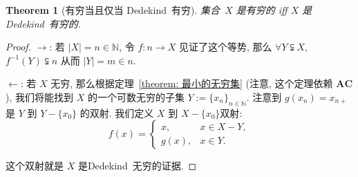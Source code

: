 \documentclass[openany]{ctexbook}
\theoremstyle{plain}
\newtheorem{theorem}{Theorem}[section] %
\theoremstyle{definition}
\newcommand*{\properclass}[1]{\mathbf{#1}}
\begin{document}
\begin{theorem}[有穷当且仅当 Dedekind~有穷]
	集合~$X$ 是有穷的 iff $X$ 是 Dedekind~有穷的.
\end{theorem}
\begin{proof}
	$\to$: 若 $|X| = n \in \mathbb N$, 令 $f \colon n \to X$ 见证了这个等势, 那么 $\forall Y \subsetneqq X$, $f^{-1}(Y) \subsetneqq n$ 从而 $|Y| = m \in n$.
	
	$\gets$: 若 $X$ 无穷, 那么根据定理~\ref{theorem: 最小的无穷集} (注意, 这个定理依赖 $\properclass{AC}$), 我们将能找到 $X$ 的一个可数无穷的子集 $Y := \{x_n\}_{n \in \mathbb N}$. 
	注意到 $g(x_n) = x_{n+}$ 是 $Y$ 到 $Y - \{x_0\}$ 的双射. 
	我们定义 $X$ 到 $X - \{x_0\}$双射:
	\begin{equation*}
		f(x) = \begin{cases}
			x, & x \in X - Y, \\
			g(x), & x \in Y.
		\end{cases}
	\end{equation*}

	这个双射就是 $X$ 是Dedekind~无穷的证据.
\end{proof}


\backmatter
\nocite{*}
\printbibliography[heading=bibliography, title={参考文献}]

\printindex[symbol]

\printindex
\end{document}
